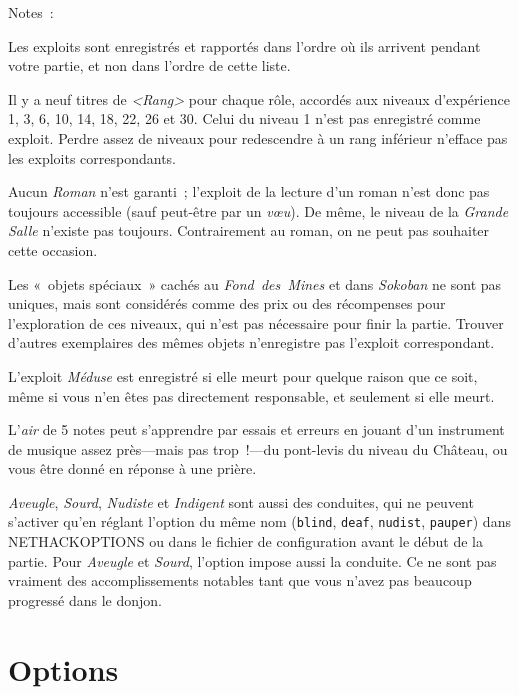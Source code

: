 \documentclass[titlepage]{article}
\begin{document}
\begin{description}
\item[{Notes~:}]

\end{description}

Les exploits sont enregistrés et rapportés dans l'ordre où ils arrivent
pendant votre partie, et non dans l'ordre de cette liste.


Il y a neuf titres de \textit{\textless{}Rang\textgreater{}} pour chaque rôle, accordés aux niveaux
d'expérience 1, 3, 6, 10, 14, 18, 22, 26 et 30.
Celui du niveau 1 n'est pas enregistré comme exploit.
Perdre assez de niveaux pour redescendre à un rang inférieur n'efface pas
les exploits correspondants.


Aucun \textit{Roman} n'est garanti~; l'exploit de la lecture d'un roman n'est
donc pas toujours accessible (sauf peut-être par un \textit{vœu}).
De même, le niveau de la \textit{Grande Salle} n'existe pas toujours.
Contrairement au roman, on ne peut pas souhaiter cette occasion.


Les «~objets spéciaux~» cachés au \textit{Fond~des~Mines} et dans
\textit{Sokoban} ne sont pas uniques, mais sont considérés comme des prix ou
des récompenses pour l'exploration de ces niveaux, qui n'est pas
nécessaire pour finir la partie.
Trouver d'autres exemplaires des mêmes objets n'enregistre pas l'exploit
correspondant.


L'exploit \textit{Méduse} est enregistré si elle meurt pour quelque raison que
ce soit, même si vous n'en êtes pas directement responsable, et seulement
si elle meurt.


L'\textit{air} de 5 notes peut s'apprendre par essais et erreurs en jouant d'un
instrument de musique assez près---mais pas trop~!---du pont-levis du
niveau du Château, ou vous être donné en réponse à une prière.


\textit{Aveugle}, \textit{Sourd}, \textit{Nudiste} et \textit{Indigent} sont aussi des
conduites, qui ne peuvent s'activer qu'en réglant l'option du même nom
(\texttt{blind}, \texttt{deaf}, \texttt{nudist}, \texttt{pauper}) dans
NETHACKOPTIONS ou dans le fichier de configuration avant le début de la
partie.
Pour \textit{Aveugle} et \textit{Sourd}, l'option impose aussi la conduite.
Ce ne sont pas vraiment des accomplissements notables tant que vous n'avez
pas beaucoup progressé dans le donjon.

\section{Options}
\end{document}
